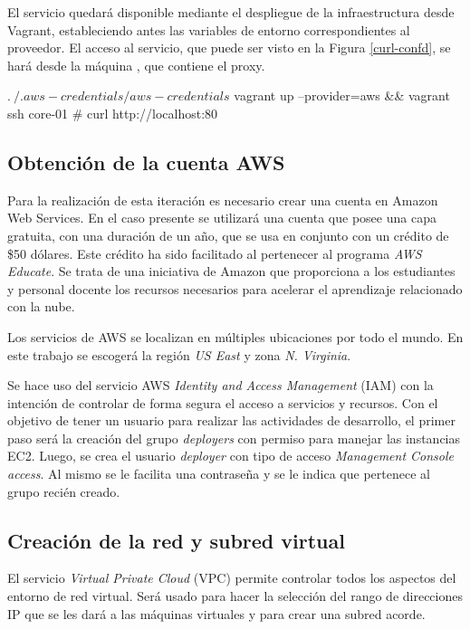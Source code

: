 El servicio quedará disponible mediante el despliegue de la infraestructura desde Vagrant, estableciendo antes las variables de entorno correspondientes al proveedor. El acceso al servicio, que puede ser visto en la Figura \ref{curl-confd}, se hará desde la máquina , que contiene el proxy.

\begin{code}
$ . ~/.aws-credentials/aws-credentials
$ vagrant up --provider=aws && vagrant ssh core-01
# curl http://localhost:80
\end{code}

\subsection{Obtención de la cuenta AWS}

Para la realización de esta iteración es necesario crear una cuenta en Amazon Web Services. En el caso presente se utilizará una cuenta que posee una capa gratuita, con una duración de un año, que se usa en conjunto con un crédito de \$50 dólares. Este crédito ha sido facilitado al pertenecer al programa \textit{AWS Educate}\cite{AWS Educate}. Se trata de una iniciativa de Amazon que proporciona a los estudiantes y personal docente los recursos necesarios para acelerar el aprendizaje relacionado con la nube.

Los servicios de AWS se localizan en múltiples ubicaciones por todo el mundo. En este trabajo se escogerá la región \textit{US East} y zona \textit{N. Virginia}.

Se hace uso del servicio AWS \textit{Identity and Access Management} (IAM) con la intención de controlar de forma segura el acceso a servicios y recursos. Con el objetivo de tener un usuario para realizar las actividades de desarrollo, el primer paso será la creación del grupo \textit{deployers} con permiso para manejar las instancias EC2. Luego, se crea el usuario \textit{deployer} con tipo de acceso \textit{Management Console access}. Al mismo se le facilita una contraseña y se le indica que pertenece al grupo recién creado.

\subsection{Creación de la red y subred virtual}

El servicio \textit{Virtual Private Cloud} (VPC) permite controlar todos los aspectos del entorno de red virtual. Será usado para hacer la selección del rango de direcciones IP que se les dará a las máquinas virtuales y para crear una subred acorde.

